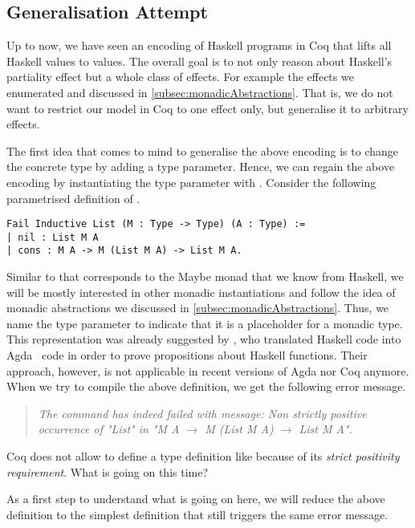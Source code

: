 \subsection{Generalisation Attempt}
\label{subsec:genericLifting}

Up to now, we have seen an encoding of Haskell programs in Coq that lifts all Haskell values to  values.
The overall goal is to not only reason about Haskell's partiality effect but a whole class of effects.
For example the effects we enumerated and discussed in \autoref{subsec:monadicAbstractions}.
That is, we do not want to restrict our model in Coq to one effect only, but generalise it to arbitrary effects.

The first idea that comes to mind to generalise the above encoding is to change the concrete type  by adding a type parameter.
Hence, we can regain the above encoding by instantiating the type parameter with .
Consider the following parametrised definition of .

\begin{verbatim}
Fail Inductive List (M : Type -> Type) (A : Type) :=
| nil : List M A
| cons : M A -> M (List M A) -> List M A.
\end{verbatim}

Similar to  that corresponds to the Maybe monad that we know from Haskell, we will be mostly interested in other monadic instantiations and follow the idea of monadic abstractions we discussed in \autoref{subsec:monadicAbstractions}.
Thus, we name the type parameter  to indicate that it is a placeholder for a monadic type.
This representation was already suggested by \citet{abel2005verifying}, who translated Haskell code into Agda~\citep{norell2008dependently} code in order to prove propositions about Haskell functions.
Their approach, however, is not applicable in recent versions of Agda nor Coq anymore.
When we try to compile the above definition, we get the following error message.

\begin{quote}
\emph{The command has indeed failed with message:
Non strictly positive occurrence of "List" in "M A $\rightarrow$ M (List M A) $\rightarrow$ List M A".}
\end{quote}

Coq does not allow to define a type definition like  because of its \emph{strict positivity requirement}.
What is going on this time?

As a first step to understand what is going on here, we will reduce the above definition to the simplest definition that still triggers the same error message.

